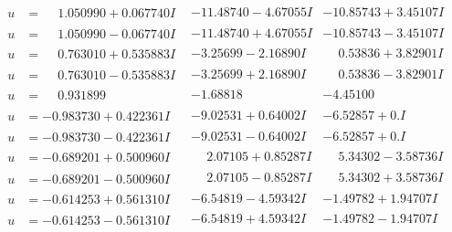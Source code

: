 \documentclass[1p]{elsarticle_modified}
\theoremstyle{definition}
\begin{document}
$$\begin{array}{c|c|c}
\begin{aligned}
u &= \phantom{-}1.050990 + 0.067740 I\end{aligned}
 & -11.48740 - 4.67055 I & -10.85743 + 3.45107 I \\ \hline\begin{aligned}
u &= \phantom{-}1.050990 - 0.067740 I\end{aligned}
 & -11.48740 + 4.67055 I & -10.85743 - 3.45107 I \\ \hline\begin{aligned}
u &= \phantom{-}0.763010 + 0.535883 I\end{aligned}
 & -3.25699 - 2.16890 I & \phantom{-}0.53836 + 3.82901 I \\ \hline\begin{aligned}
u &= \phantom{-}0.763010 - 0.535883 I\end{aligned}
 & -3.25699 + 2.16890 I & \phantom{-}0.53836 - 3.82901 I \\ \hline\begin{aligned}
u &= \phantom{-}0.931899\phantom{ +0.000000I}\end{aligned}
 & -1.68818\phantom{ +0.000000I} & -4.45100\phantom{ +0.000000I} \\ \hline\begin{aligned}
u &= -0.983730 + 0.422361 I\end{aligned}
 & -9.02531 + 0.64002 I & -6.52857 + 0. I\phantom{ +0.000000I} \\ \hline\begin{aligned}
u &= -0.983730 - 0.422361 I\end{aligned}
 & -9.02531 - 0.64002 I & -6.52857 + 0. I\phantom{ +0.000000I} \\ \hline\begin{aligned}
u &= -0.689201 + 0.500960 I\end{aligned}
 & \phantom{-}2.07105 + 0.85287 I & \phantom{-}5.34302 - 3.58736 I \\ \hline\begin{aligned}
u &= -0.689201 - 0.500960 I\end{aligned}
 & \phantom{-}2.07105 - 0.85287 I & \phantom{-}5.34302 + 3.58736 I \\ \hline\begin{aligned}
u &= -0.614253 + 0.561310 I\end{aligned}
 & -6.54819 - 4.59342 I & -1.49782 + 1.94707 I \\ \hline\begin{aligned}
u &= -0.614253 - 0.561310 I\end{aligned}
 & -6.54819 + 4.59342 I & -1.49782 - 1.94707 I \\ \hline\begin{aligned}

\end{aligned}
\end{array}$$
\end{document}
